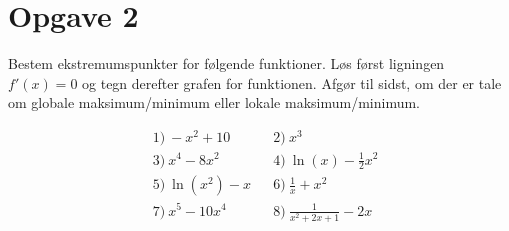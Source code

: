 \section*{Opgave 2}

Bestem ekstremumspunkter for følgende funktioner. Løs først ligningen $f'(x)=0$ og tegn derefter grafen for funktionen.  Afgør til sidst, om der er tale om globale maksimum/minimum eller lokale maksimum/minimum.

\begin{align*}
	&1) \ -x^2+10    &&2) \  x^3     \\
	&3) \  x^4-8x^2   &&4) \ \ln(x) - \frac{1}{2}x^2      \\
	&5) \ \ln(x^2)-x    &&6) \   \frac{1}{x} +x^2    \\
	&7) \  x^5-10x^4   &&8) \ \frac{1}{x^2+2x+1} - 2x      \\
\end{align*}